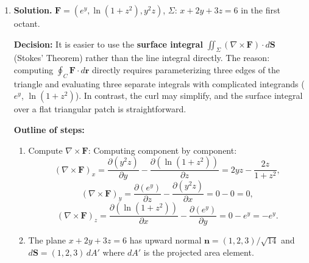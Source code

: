 \begin{enumerate}
\textbf{Step 2:} Parameterize $\Sigma$: the paraboloid $z=x^2+y^2$ for $x^2+y^2\le 4$. Use $\mathbf{r}(x,y)=(x,y,x^2+y^2)$.

$\mathbf{r}_x=(1,0,2x)$, $\mathbf{r}_y=(0,1,2y)$.

For Stokes' Theorem with the boundary oriented counterclockwise when viewed from above, we need the upward-oriented normal:
\[
\mathbf{r}_x\times\mathbf{r}_y = (-2x,-2y,1).
\]

\textbf{Step 3:} By Stokes' Theorem:
\[
\oint_C\mathbf{F}\cdot d\mathbf{r} = \iint_\Sigma(\nabla\times\mathbf{F})\cdot d\mathbf{S}.
\]

$(\nabla\times\mathbf{F})\cdot(\mathbf{r}_x\times\mathbf{r}_y) = (-2z)(-2x)+(-2x)(-2y)+(-2y)(1)$.

On $\Sigma$: $z=x^2+y^2$:
\[
= 4x(x^2+y^2)+4xy-2y.
\]

\[
\boxed{\oint_C\mathbf{F}\cdot d\mathbf{r} = \iint_{x^2+y^2\le 4}\left[4x(x^2+y^2)+4xy-2y\right]dA.}
\]

\item \textbf{Solution.}
$\mathbf{F}=(e^y, \ln(1+z^2), y^2z)$, $\Sigma$: $x+2y+3z=6$ in the first octant.

\textbf{Decision:} It is easier to use the \textbf{surface integral} $\iint_\Sigma(\nabla\times\mathbf{F})\cdot d\mathbf{S}$ (Stokes' Theorem) rather than the line integral directly. The reason: computing $\oint_C \mathbf{F}\cdot d\mathbf{r}$ directly requires parameterizing three edges of the triangle and evaluating three separate integrals with complicated integrands ($e^y$, $\ln(1+z^2)$). In contrast, the curl may simplify, and the surface integral over a flat triangular patch is straightforward.

\textbf{Outline of steps:}
\begin{enumerate}
\item Compute $\nabla\times\mathbf{F}$:
Computing component by component:
\[
(\nabla\times\mathbf{F})_x = \frac{\partial(y^2z)}{\partial y}-\frac{\partial(\ln(1+z^2))}{\partial z} = 2yz - \frac{2z}{1+z^2},
\]
\[
(\nabla\times\mathbf{F})_y = \frac{\partial(e^y)}{\partial z}-\frac{\partial(y^2z)}{\partial x} = 0-0 = 0,
\]
\[
(\nabla\times\mathbf{F})_z = \frac{\partial(\ln(1+z^2))}{\partial x}-\frac{\partial(e^y)}{\partial y} = 0-e^y = -e^y.
\]

\item The plane $x+2y+3z=6$ has upward normal $\mathbf{n}=(1,2,3)/\sqrt{14}$ and $d\mathbf{S}=(1,2,3)\,dA'$ where $dA'$ is the projected area element.


\end{enumerate}
\end{enumerate}
